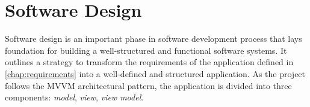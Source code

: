 \section{Software Design}
Software design is an important phase in software development process that lays foundation for building a well-structured and functional software systems. 
It outlines a strategy to transform the requirements of the application defined in \autoref{chap:requirements} into a well-defined and structured application.
As the project follows the MVVM architectural pattern, the application is divided into three components: \emph{model}, \emph{view}, \emph{view model}. 



